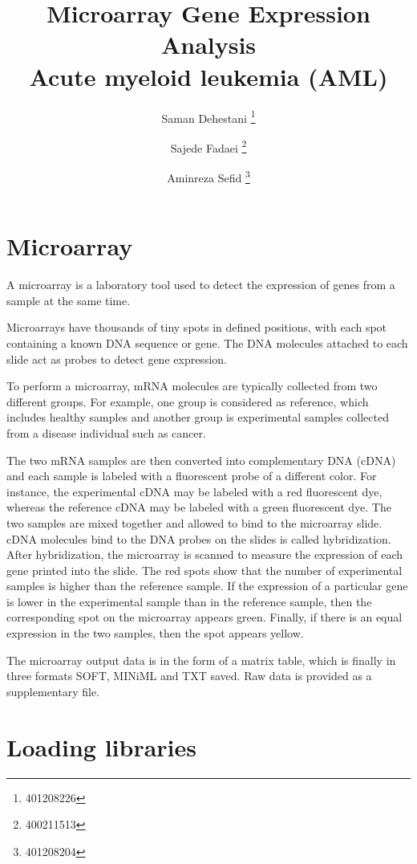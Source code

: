 \documentclass[11pt]{article}
\title{
    Microarray Gene Expression Analysis\\
    \large Acute myeloid leukemia (AML)
    }
\author{Saman Dehestani \thanks{401208226} \and Sajede Fadaei \thanks{400211513} \and Aminreza Sefid \thanks{401208204}}
\begin{document}
    
    \maketitle
    
    

    
    \hypertarget{microarray}{%
\section{Microarray}\label{microarray}}

A microarray is a laboratory tool used to detect the expression of genes
from a sample at the same time.

Microarrays have thousands of tiny spots in defined positions, with each
spot containing a known DNA sequence or gene. The DNA molecules attached
to each slide act as probes to detect gene expression.

To perform a microarray, mRNA molecules are typically collected from two
different groups. For example, one group is considered as reference,
which includes healthy samples and another group is experimental samples
collected from a disease individual such as cancer.

The two mRNA samples are then converted into complementary DNA (cDNA)
and each sample is labeled with a fluorescent probe of a different
color. For instance, the experimental cDNA may be labeled with a red
fluorescent dye, whereas the reference cDNA may be labeled with a green
fluorescent dye. The two samples are mixed together and allowed to bind
to the microarray slide. cDNA molecules bind to the DNA probes on the
slides is called hybridization. After hybridization, the microarray is
scanned to measure the expression of each gene printed into the slide.
The red spots show that the number of experimental samples is higher
than the reference sample. If the expression of a particular gene is
lower in the experimental sample than in the reference sample, then the
corresponding spot on the microarray appears green. Finally, if there is
an equal expression in the two samples, then the spot appears yellow.

The microarray output data is in the form of a matrix table, which is
finally in three formats SOFT, MINiML and TXT saved. Raw data is
provided as a supplementary file.
\newpage
    \hypertarget{loading-libraries}{%
\section{Loading libraries}\label{loading-libraries}}
\end{document}
